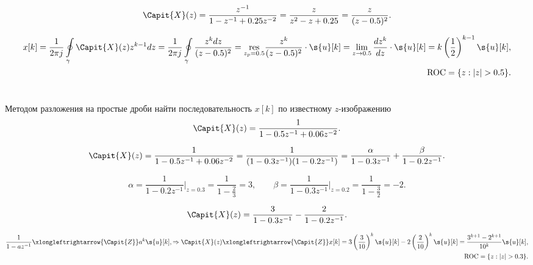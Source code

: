 \begin{equation*}
	\Capit{X}(z) = \dfrac{z^{-1}}{1 - z^{-1} + 0.25z^{-2}} = \dfrac{z}{z^2 - z + 0.25} = \dfrac{z}{(z - 0.5)^2}.
\end{equation*}

\begin{align*}
	x[k] = \dfrac{1}{2 \pi j} \oint \limits_{\gamma} \Capit{X}(z) z^{k-1} dz = 
	\dfrac{1}{2 \pi j} \oint \limits_{\gamma} \dfrac{z^k dz}{(z - 0.5)^2} = 
	\underset{z_p = 0.5}{\text{res}} \dfrac{z^k}{(z - 0.5)^2} \cdot \s{u}[k] = \lim \limits_{z \to 0.5} \dfrac{dz^k}{dz} \cdot \s{u}[k] = k \left(\dfrac{1}{2}\right)^{k-1} \s{u}[k],\\
	\text{ROC} = \{z: |z| > 0.5\}.
\end{align*}





\section{}
Методом разложения на простые дроби найти последовательность $x[k]$ по известному $z$-изображению
\begin{equation*}
	\Capit{X}(z) = \dfrac{1}{1 - 0.5z^{-1} + 0.06z^{-2}}.
\end{equation*}

\begin{equation*}
	\Capit{X}(z) = \dfrac{1}{1 - 0.5z^{-1} + 0.06z^{-2}} = \dfrac{1}{(1 - 0.3z^{-1})(1 - 0.2z^{-1})} = \dfrac{\alpha}{1 - 0.3z^{-1}} + \dfrac{\beta}{1 - 0.2z^{-1}}.
\end{equation*}

\begin{equation*}
	\alpha  = \dfrac{1}{1 - 0.2z^{-1}}\Big|_{z = 0.3} = \dfrac{1}{1 - \frac{2}{3}} = 3, \qquad
	\beta  = \dfrac{1}{1 - 0.3z^{-1}}\Big|_{z = 0.2} = \dfrac{1}{1 - \frac{3}{2}} = -2.
\end{equation*}

\begin{equation*}
	\Capit{X}(z) = \dfrac{3}{1 - 0.3z^{-1}} - \dfrac{2}{1 - 0.2z^{-1}}.
\end{equation*}

\begin{align*}
	\dfrac{1}{1 - az^{-1}} \xlongleftrightarrow{\Capit{Z}} a^k \s{u}[k], \Rightarrow
	\Capit{X}(z) \xlongleftrightarrow{\Capit{Z}} 
	x[k] = 3 \left(\frac{3}{10}\right)^k \s{u}[k] - 2 \left(\frac{2}{10}\right)^k \s{u}[k] = 
	\dfrac{3^{k+1} - 2^{k+1}}{10^k} \s{u}[k],\\
	\text{ROC} = \{z: |z| > 0.3\}.
\end{align*}

